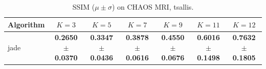 \begin{table}[htbp]
\centering
\caption{SSIM ($\mu \pm \sigma$) on CHAOS MRI, tsallis.}
\label{tab:exp2-tsallis-ssim}
\begin{tabular}{lcccccc}
\toprule
Algorithm & $K=3$ & $K=5$ & $K=7$ & $K=9$ & $K=11$ & $K=12$ \\
\midrule
jade & \textbf{0.2650 $\pm$ 0.0370} & \textbf{0.3347 $\pm$ 0.0436} & \textbf{0.3878 $\pm$ 0.0616} & \textbf{0.4550 $\pm$ 0.0676} & \textbf{0.6016 $\pm$ 0.1498} & \textbf{0.7632 $\pm$ 0.1805} \\
\bottomrule
\end{tabular}
\end{table}